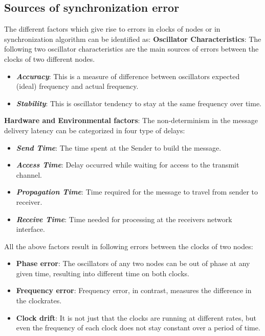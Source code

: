 \documentclass[journal]{IEEEtran}
\begin{document}
\subsection{\textbf{Sources of synchronization error}}\noindent
The different factors which give rise to errors in clocks of nodes or in synchronization
algorithm can be identified as:\newline
\textbf{Oscillator Characteristics}: The following two oscillator characteristics are the main sources of errors between the clocks of two different nodes.
         \begin{itemize}
         \item \emph{\textbf{Accuracy}}: This is a measure of difference between oscillators expected (ideal)
           frequency and actual frequency. 
         \item \emph{\textbf{Stability}}: This is oscillator tendency to stay at the same frequency over
           time.
      \end{itemize}
\textbf{Hardware and Environmental factors}: The non-determinism in the message delivery latency can be categorized in four type of delays:
      \begin{itemize}
         \item \emph{\textbf{Send Time}}: The time spent at the Sender to build the message.
         \item \emph{\textbf{Access Time}}: Delay occurred while waiting for access to the transmit channel.
         \item \emph{\textbf{Propagation Time}}: Time required for the message to travel from sender to receiver.
         \item \emph{\textbf{Receive Time}}: Time needed for processing at the receivers network
         interface.
      \end{itemize}
All the above factors result in following errors between the clocks of two nodes:
\begin{itemize}
\item \textbf{Phase error}: The oscillators of any two nodes can be out of phase at any given time, resulting into different time on both clocks. 
\item \textbf{Frequency error}: Frequency error, in contrast, measures the difference in the clockrates.
\item \textbf{Clock drift}: It is not just that the clocks are running at different rates, but even the frequency of each clock does not stay constant over a period of time.
\end{itemize}
\end{document}
